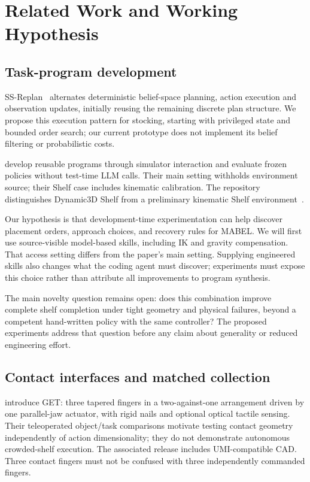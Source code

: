 \section{Related Work and Working Hypothesis}
\subsection{Task-program development}
SS-Replan~\citep{garrett2020replan} alternates deterministic belief-space
planning, action execution and observation updates, initially reusing the
remaining discrete plan structure. We propose this execution pattern for
stocking, starting with privileged state and bounded order search; our current
prototype does not implement its belief filtering or probabilistic costs.

\citet{merler2026coding} develop reusable programs through simulator interaction
and evaluate frozen policies without test-time LLM calls. Their main setting
withholds environment source; their Shelf case includes kinematic calibration.
The repository distinguishes Dynamic3D Shelf from a preliminary kinematic Shelf
environment~\citep{robocode2026}.

Our hypothesis is that development-time experimentation can help discover
placement orders, approach choices, and recovery rules for MABEL. We will first
use source-visible model-based skills, including IK and gravity compensation.
That access setting differs from the paper's main setting. Supplying engineered
skills also changes what the coding agent must discover; experiments must expose
this choice rather than attribute all improvements to program synthesis.

The main novelty question remains open: does this combination improve complete
shelf completion under tight geometry and physical failures, beyond a competent
hand-written policy with the same controller? The proposed experiments address
that question before any claim about generality or reduced engineering effort.

\subsection{Contact interfaces and matched collection}
\citet{burgess2025get} introduce GET: three tapered fingers in a two-against-one
arrangement driven by one parallel-jaw actuator, with rigid nails and optional
optical tactile sensing. Their teleoperated object/task comparisons motivate
testing contact geometry independently of action dimensionality; they do not
demonstrate autonomous crowded-shelf execution. The associated release includes
UMI-compatible CAD. Three contact fingers must not be confused with three
independently commanded fingers.

